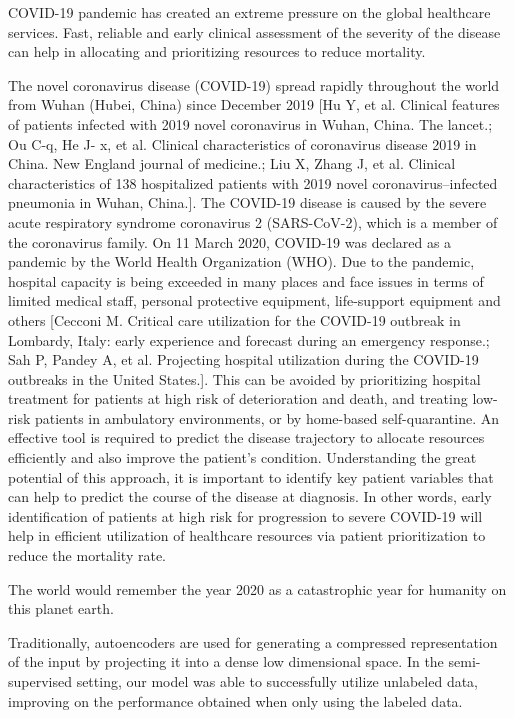 COVID-19 pandemic has created an extreme pressure on the global healthcare services. Fast, reliable and early clinical assessment of the severity of the disease can help in allocating and prioritizing resources to reduce mortality.

The novel coronavirus disease (COVID-19) spread rapidly throughout the world from Wuhan (Hubei, China) since December 2019 [Hu Y, et al. Clinical features of patients infected with 2019 novel coronavirus in Wuhan, China. The lancet.; Ou C-q, He J- x, et al. Clinical characteristics of coronavirus disease 2019 in China. New England journal of medicine.; Liu X, Zhang J, et al. Clinical characteristics of 138 hospitalized patients with 2019 novel coronavirus–infected pneumonia in Wuhan, China.]. The COVID-19 disease is caused by the severe acute respiratory syndrome coronavirus 2 (SARS-CoV-2), which is a member of the coronavirus family. On 11 March 2020, COVID-19 was declared as a pandemic by the World Health Organization (WHO). Due to the pandemic, hospital capacity is being exceeded in many places and face issues in terms of limited medical staff, personal protective equipment, life-support equipment and others [Cecconi M. Critical care utilization for the COVID-19 outbreak in Lombardy, Italy: early experience and forecast during an emergency response.; Sah P, Pandey A, et al. Projecting hospital utilization during the COVID-19 outbreaks in the United States.].
This can be avoided by prioritizing hospital treatment for patients at high risk of deterioration and death, and treating low-risk patients in ambulatory environments, or by home-based self-quarantine. An effective tool is required to predict the disease trajectory to allocate resources efficiently and also improve the patient’s condition. Understanding the great potential of this approach, it is important to identify key patient variables that can help to predict the course of the disease at diagnosis. In other words, early identification of patients at high risk for progression to severe COVID-19 will help in efficient utilization of healthcare resources via patient prioritization to reduce the mortality rate.

The world would remember the year 2020 as a catastrophic year for humanity on this planet earth.

Traditionally, autoencoders are used for generating a compressed representation of the input by projecting it into a dense low dimensional space.
In the semi- supervised setting, our model was able to successfully utilize unlabeled data, improving on the performance obtained when only using the labeled data.


